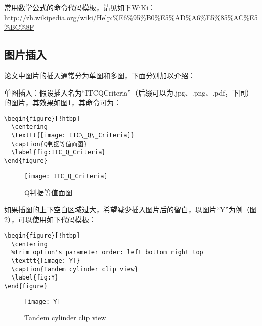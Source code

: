 常用数学公式的命令代码模板，请见如下WiKi：\url{http://zh.wikipedia.org/wiki/Help:%E6%95%B0%E5%AD%A6%E5%85%AC%E5%BC%8F}

\subsection{图片插入}

论文中图片的插入通常分为单图和多图，下面分别加以介绍：

单图插入：假设插入名为“ITC\textunderscore Q\textunderscore Criteria”（后缀可以为.jpg、.png、.pdf，下同）的图片，其效果如图\ref{fig:ITC_Q_Criteria}，其命令可为：
\begin{verbatim}
\begin{figure}[!htbp]
  \centering
  \texttt{[image: ITC\_Q\_Criteria]}
  \caption{Q判据等值面图}
  \label{fig:ITC_Q_Criteria}
\end{figure}
\end{verbatim}
\begin{figure}[!htbp]
  \centering
  \texttt{[image: ITC\_Q\_Criteria]}
  \caption{Q判据等值面图}
  \label{fig:ITC_Q_Criteria}
\end{figure}

如果插图的上下空白区域过大，希望减少插入图片后的留白，以图片“Y”为例（图\ref{fig:Y}），可以使用如下代码模板：
\begin{verbatim}
\begin{figure}[!htbp]
  \centering
  %trim option's parameter order: left bottom right top
  \texttt{[image: Y]}
  \caption{Tandem cylinder clip view}
  \label{fig:Y}
\end{figure}
\end{verbatim}
\begin{figure}[!htbp]
  \centering
  \texttt{[image: Y]}
  \caption{Tandem cylinder clip view}
  \label{fig:Y}
\end{figure}

